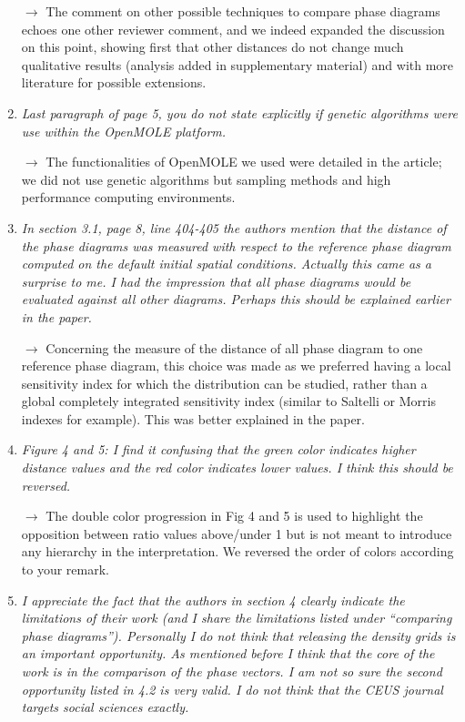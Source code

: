 \documentclass[11pt,a4paper,sans]{moderncv}        %
\begin{document}
\begin{enumerate}
	\medskip
	
	$\rightarrow$ The comment on other possible techniques to compare phase diagrams echoes one other reviewer comment, and we indeed expanded the discussion on this point, showing first that other distances do not change much qualitative results (analysis added in supplementary material) and with more literature for possible extensions.
	\bigskip
	
	\item \textit{Last paragraph of page 5, you do not state explicitly if genetic algorithms were use within the OpenMOLE platform.}
	
	\medskip
	
	$\rightarrow$ The functionalities of OpenMOLE we used were detailed in the article; we did not use genetic algorithms but sampling methods and high performance computing environments.
	\bigskip
	
	\item \textit{In section 3.1, page 8, line 404-405 the authors mention that the distance of the phase diagrams was measured with respect to the reference phase diagram computed on the default initial spatial conditions. Actually this came as a surprise to me. I had the impression that all phase diagrams would be evaluated against all other diagrams. Perhaps this should be explained earlier in the paper.}
	
	\medskip
	
	$\rightarrow$ Concerning the measure of the distance of all phase diagram to one reference phase diagram, this choice was made as we preferred having a local sensitivity index for which the distribution can be studied, rather than a global completely integrated sensitivity index (similar to Saltelli or Morris indexes for example). This was better explained in the paper.
	\bigskip
 
	
	\item \textit{Figure 4 and 5: I find it confusing that the green color indicates higher distance values and the red color indicates lower values. I think this should be reversed.}
	
	\medskip
	
    $\rightarrow$ The double color progression in Fig 4 and 5 is used to highlight the opposition between ratio values above/under 1 but is not meant to introduce any hierarchy in the interpretation. We reversed the order of colors according to your remark.
   	\bigskip
   	
   	
	\item \textit{I appreciate the fact that the authors in section 4 clearly indicate the limitations of their work (and I share the limitations listed under “comparing phase diagrams”). Personally I do not think that releasing the density grids is an important opportunity. As mentioned before I think that the core of the work is in the comparison of the phase vectors. I am not so sure the second opportunity listed in 4.2 is very valid. I do not think that the CEUS journal targets social sciences exactly.}
	

\end{enumerate}
\end{document}
